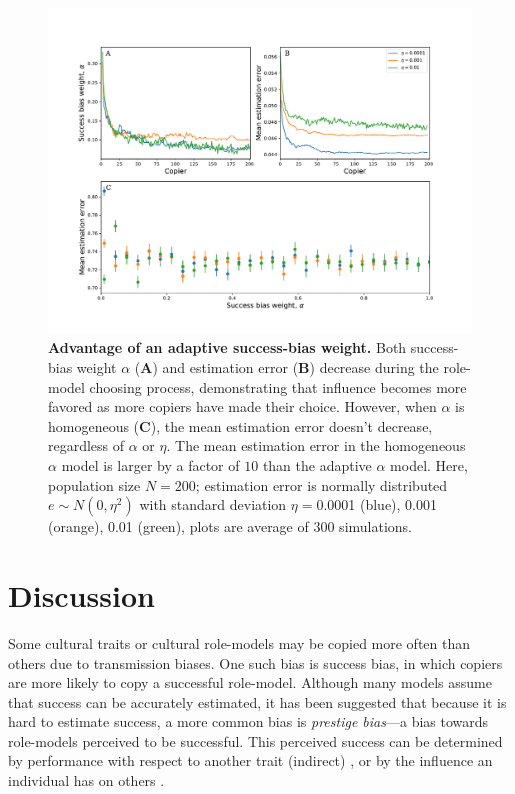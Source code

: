 \documentclass[12pt]{extarticle}
\begin{document}
\begin{figure}[h]
    \includegraphics[width=\linewidth]{choose_bias.pdf}
  \caption{
  \textbf{Advantage of an adaptive success-bias weight.}
  Both success-bias weight $\alpha$ (\textbf{A}) and estimation error (\textbf{B}) decrease during the role-model choosing process, demonstrating that influence becomes more favored as more copiers have made their choice.
However, when $\alpha$ is homogeneous (\textbf{C}), the mean estimation error doesn't decrease, regardless of $\alpha$ or $\eta$.
The mean estimation error in the homogeneous $\alpha$ model is larger by a factor of $10$ than the adaptive $\alpha$ model.
Here, population size $N=200$; estimation error is normally distributed $e \sim N(0,\eta^2)$ with standard deviation $\eta=$0.0001 (blue), 0.001 (orange), 0.01 (green), plots are average of $300$ simulations.}	
  \label{fig:influence_advantage}
\end{figure}



\section*{Discussion}
{Some} cultural traits or cultural role-models may be copied more often {than others} due to transmission biases. 
{One such} bias is success bias, in which copiers are more likely to copy a successful role-model. {Although many} models assume that success can be accurately estimated{, it} has been suggested that because it is hard to estimate success, a more common bias is \emph{prestige bias}---a bias towards role-models perceived to be successful.
This perceived success can be determined by performance with respect to another trait (indirect) \citep{evolutionBook,fijian_social_bias}, or by the influence an individual has on others \citep{prestige_cultural_learning,prestige_evolution}.
\end{document}
